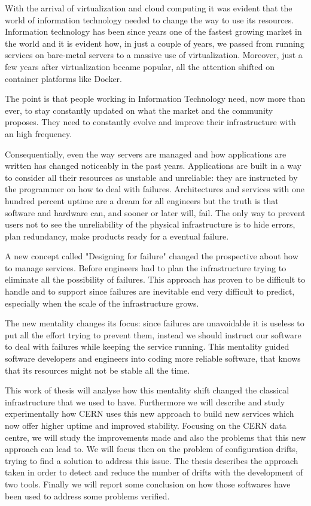 
With the arrival of virtualization and cloud computing it was evident that
the world of information technology needed to change the way to use its
resources. Information technology has been since years one of the fastest
growing market in the world and it is evident how, in just a couple of
years, we passed from running services on bare-metal servers to a massive
use of virtualization. Moreover, just a few years after virtualization
became popular, all the attention shifted on container platforms like
Docker.

The point is that people working in Information Technology need, now more than
ever, to stay constantly updated on what the market and the community proposes. They need to constantly evolve and improve their infrastructure with an high
frequency.

Consequentially, even the way servers are managed and how applications are
written has changed noticeably in the past years. Applications are built
in a way to consider all their resources as unstable and unreliable: they
are instructed by the programmer on how to deal with failures.
Architectures and services with one hundred percent uptime are a dream for
all engineers but the truth is that software and hardware can, and sooner
or later will, fail. The only way to prevent users not to see the
unreliability of the physical infrastructure is to hide errors, plan
redundancy, make products ready for a eventual failure.

A new concept called "Designing for failure" changed the prospective about
how to manage services. Before engineers had to plan the infrastructure
trying to eliminate all the possibility of failures. This approach has
proven to be difficult to handle and to support since failures are
inevitable end very difficult to predict, especially when the scale of the
infrastructure grows.

The new mentality changes its focus: since failures are unavoidable it is
useless to put all the effort trying to prevent them, instead we should
instruct our software to deal with failures while keeping the service
running. This mentality guided software developers and engineers into
coding more reliable software, that knows that its resources might not be
stable all the time.

This work of thesis will analyse how this mentality shift changed the
classical infrastructure that we used to have. Furthermore we will
describe and study experimentally how CERN uses this new approach to build
new services which now offer higher uptime and improved stability.
Focusing on the CERN data centre, we will study the improvements made and
also the problems that this new approach can lead to. We will focus then
on the problem of configuration drifts, trying to find a solution to
address this issue. The thesis describes the approach taken in order to
detect and reduce the number of drifts with the development of two tools.
Finally we will report some conclusion on how those softwares have been
used to address some problems verified.

